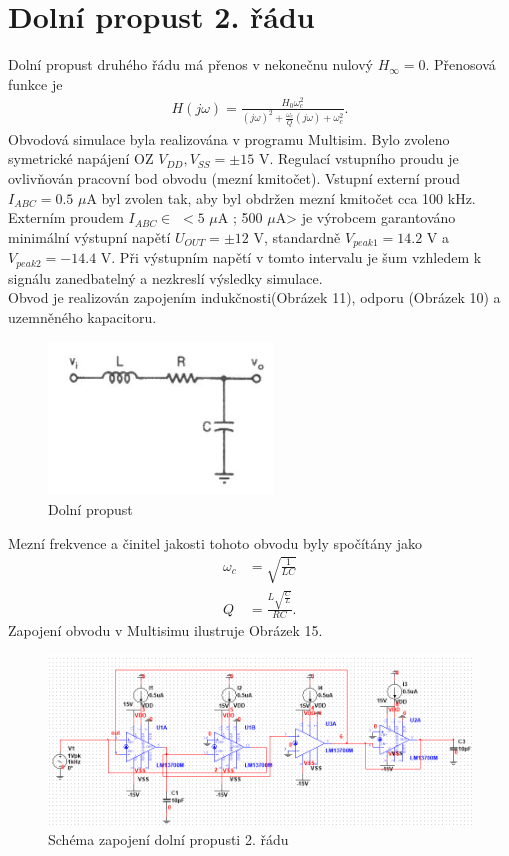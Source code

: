 \documentclass[twoside]{article}
\begin{document}
\section{Dolní propust 2. řádu}
Dolní propust druhého řádu má přenos v nekonečnu nulový $H_{\infty} = 0$. Přenosová funkce je
\begin{align}
H(j\omega) = \frac{H_0 \omega_c ^2}{(j\omega)^2 + \frac{\omega _c}{Q}(j\omega) + \omega _c ^2}.
\end{align}
Obvodová simulace byla realizována v programu Multisim. Bylo zvoleno symetrické napájení OZ $V_{DD},V_{SS} = \pm 15$ V. Regulací vstupního proudu je ovlivňován pracovní bod obvodu (mezní kmitočet). Vstupní externí proud $I_{ABC} = 0.5$ $\mu$A byl zvolen tak, aby byl obdržen mezní kmitočet cca 100 kHz. Externím proudem $I_{ABC} \in$ $<5$ $\mu$A ; 500 $\mu$A> je výrobcem garantováno minimální výstupní napětí $U_{OUT} = \pm 12$ V, standardně $V_{peak 1} = 14.2$ V a $V_{peak 2} = -14.4$ V. Při výstupním napětí v tomto intervalu je šum vzhledem k signálu zanedbatelný a nezkreslí výsledky simulace.\\
\noindent Obvod je realizován zapojením indukčnosti(Obrázek 11), odporu (Obrázek 10) a uzemněného kapacitoru. 
\begin{figure}[H]
\centering
\includegraphics[scale=0.9]{171.png}
\caption{Dolní propust \cite{9}}
\end{figure}
\noindent Mezní frekvence a činitel jakosti tohoto obvodu byly spočítány jako 
\begin{align}
\omega _c &= \sqrt{\frac{1}{LC}}\\
Q &= \frac{L\sqrt{\frac{C}{L}}}{RC}.
\end{align}
Zapojení obvodu v Multisimu ilustruje Obrázek 15.
\begin{figure}[H]
\centering
\includegraphics[scale=0.5]{1707.png}
\caption{Schéma zapojení dolní propusti 2. řádu}
\end{figure}
\end{document}
